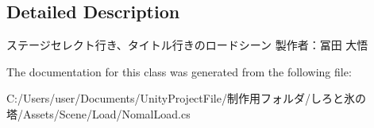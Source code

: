 \subsection{Detailed Description}
ステージセレクト行き、タイトル行きのロードシーン 製作者：冨田 大悟 



The documentation for this class was generated from the following file\+:\begin{DoxyCompactItemize}
\item 
C\+:/\+Users/user/\+Documents/\+Unity\+Project\+File/制作用フォルダ/しろと氷の塔/\+Assets/\+Scene/\+Load/Nomal\+Load.\+cs\end{DoxyCompactItemize}
